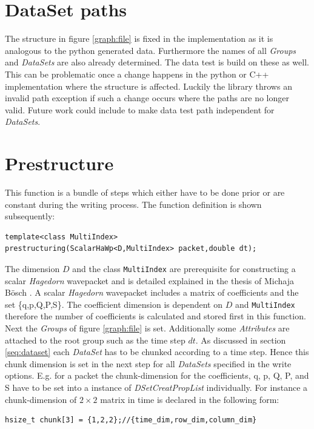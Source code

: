 \section{DataSet paths}
The structure in figure \ref{graph:file} is fixed in the implementation as it is analogous to the python generated data. Furthermore the names of all \textit{Groups} and \textit{DataSets} are also already determined. The data test is build on these as well. This can be problematic once a change happens in the python or C++ implementation where the structure is affected. Luckily the library throws an invalid path exception if such a change occurs where the paths are no longer valid. Future work could include to make data test path independent for \textit{DataSets}.

\section{Prestructure}
\label{seq:prestructure}
This function is a bundle of steps which either have to be done prior or are constant during the writing process. The function definition is shown subsequently:
\begin{lstlisting}
template<class MultiIndex>
prestructuring(ScalarHaWp<D,MultiIndex> packet,double dt);
\end{lstlisting}
The dimension $D$ and the class \texttt{MultiIndex} are prerequisite for constructing a scalar \textit{Hagedorn} wavepacket and is detailed explained in the thesis of Michaja B\"osch \cite{bt_michajab}. A scalar \textit{Hagedorn} wavepacket includes a matrix of coefficients and the set \{q,p,Q,P,S\}. The coefficient dimension is dependent on $D$ and \texttt{MultiIndex} therefore the number of coefficients is calculated and stored first in this function. Next the \textit{Groups} of figure \ref{graph:file} is set. Additionally some \textit{Attributes} are attached to the root group such as the time step $dt$. As discussed in section \ref{seq:dataset} each \textit{DataSet} has to be chunked according to a time step. Hence this chunk dimension is set in the next step for all \textit{DataSets} specified in the write options. E.g. for a packet the chunk-dimension for the coefficients, q, p, Q, P, and S have to be set into a instance of \textit{DSetCreatPropList} individually. 
For instance a chunk-dimension of $2 \times 2$ matrix in time is declared in the following form:
\begin{lstlisting}
hsize_t chunk[3] = {1,2,2};//{time_dim,row_dim,column_dim}
\end{lstlisting}
